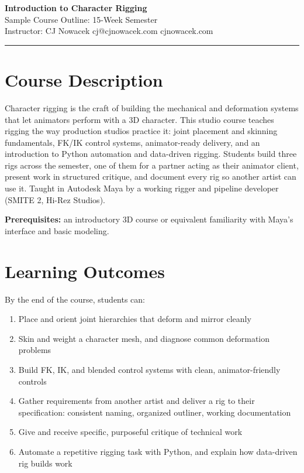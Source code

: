 \documentclass[10pt,a4paper]{article}
\begin{document}
{\huge\bfseries Introduction to Character Rigging}\\[2pt]
{\large\color{accent} Sample Course Outline: 15-Week Semester}\\[2pt]
{\small Instructor: CJ Nowacek \textbullet{} cj@cjnowacek.com \textbullet{} cjnowacek.com}

\vspace{4pt}
\hrule

\section{Course Description}
Character rigging is the craft of building the mechanical and deformation systems that let animators perform with a 3D character. This studio course teaches rigging the way production studios practice it: joint placement and skinning fundamentals, FK/IK control systems, animator-ready delivery, and an introduction to Python automation and data-driven rigging. Students build three rigs across the semester, one of them for a partner acting as their animator client, present work in structured critique, and document every rig so another artist can use it. Taught in Autodesk Maya by a working rigger and pipeline developer (SMITE 2, Hi-Rez Studios).

\textbf{Prerequisites:} an introductory 3D course or equivalent familiarity with Maya's interface and basic modeling.

\section{Learning Outcomes}
By the end of the course, students can:
\begin{enumerate}[leftmargin=1.5em, itemsep=0pt]
    \item Place and orient joint hierarchies that deform and mirror cleanly
    \item Skin and weight a character mesh, and diagnose common deformation problems
    \item Build FK, IK, and blended control systems with clean, animator-friendly controls
    \item Gather requirements from another artist and deliver a rig to their specification: consistent naming, organized outliner, working documentation
    \item Give and receive specific, purposeful critique of technical work
    \item Automate a repetitive rigging task with Python, and explain how data-driven rig builds work
\end{enumerate}
\end{document}
